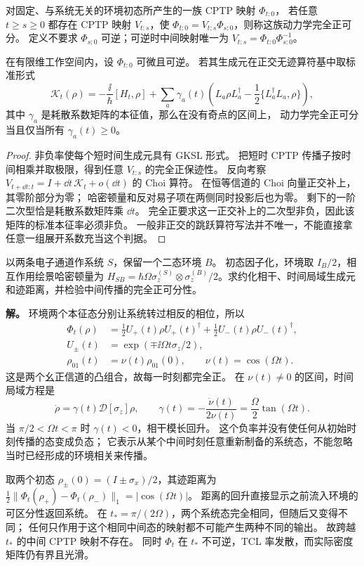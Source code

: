 \begin{definition}[完全正可分动力学]
对固定、与系统无关的环境初态所产生的一族 CPTP 映射 $\Phi_{t:0}$，
若任意 $t\ge s\ge0$ 都存在 CPTP 映射 $V_{t:s}$，使
$\Phi_{t:0}=V_{t:s}\Phi_{s:0}$，则称这族动力学完全正可分。
定义不要求 $\Phi_{s:0}$ 可逆；可逆时中间映射唯一为
$V_{t:s}=\Phi_{t:0}\Phi_{s:0}^{-1}$。
\end{definition}

\begin{proposition}[可逆时间局域方程的瞬时率判据]
在有限维工作空间内，设 $\Phi_{t:0}$ 可微且可逆。
若其生成元在正交无迹算符基中取标准形式
\[
\mathcal K_t(\rho)=-\frac{\ii}{\hbar}[H_t,\rho]
+\sum_a\gamma_a(t)
\left(L_a\rho L_a^\dagger-\frac12\{L_a^\dagger L_a,\rho\}\right),
\]
其中 $\gamma_a$ 是耗散系数矩阵的本征值，那么在没有奇点的区间上，
动力学完全正可分当且仅当所有 $\gamma_a(t)\ge0$。
\end{proposition}
\begin{proof}
非负率使每个短时间生成元具有 GKSL 形式。
把短时 CPTP 传播子按时间相乘并取极限，得到任意 $V_{t:s}$ 的完全正保迹性。
反向考察 $V_{t+\dd t:t}=I+\dd t\,\mathcal K_t+o(\dd t)$ 的 Choi 算符。
在恒等信道的 Choi 向量正交补上，其零阶部分为零；
哈密顿量和反对易子项在两侧同时投影后也为零。
剩下的一阶二次型恰是耗散系数矩阵乘 $\dd t$。
完全正要求这一正交补上的二次型非负，因此该矩阵的标准本征率必须非负。
一般非正交的跳跃算符写法并不唯一，不能直接拿任意一组展开系数充当这个判据。
\end{proof}

\begin{exbox}
以两条电子通道作系统 $S$，保留一个二态环境 $B$。
初态因子化，环境取 $I_B/2$，相互作用绘景哈密顿量为
$H_{SB}=\hbar\Omega\sigma_z^{(S)}\otimes\sigma_z^{(B)}/2$。求约化相干、时间局域生成元和迹距离，并检验中间传播的完全正可分性。

\textbf{解。}
环境两个本征态分别让系统转过相反的相位，所以
\begin{align*}
\Phi_t(\rho)&=\frac12U_+(t)\rho U_+(t)^\dagger
+\frac12U_-(t)\rho U_-(t)^\dagger,\\
U_\pm(t)&=\exp(\mp\ii\Omega t\sigma_z/2),\\
\rho_{01}(t)&=\nu(t)\rho_{01}(0),\qquad\nu(t)=\cos(\Omega t).
\end{align*}
这是两个幺正信道的凸组合，故每一时刻都完全正。
在 $\nu(t)\ne0$ 的区间，时间局域方程是
\begin{equation}
\dot\rho=\gamma(t)\mathcal D[\sigma_z]\rho,
\qquad\gamma(t)=-\frac{\dot\nu(t)}{2\nu(t)}
=\frac{\Omega}{2}\tan(\Omega t).
\label{eq:feqo-exact-finite-memory-dephasing-revival}
\end{equation}
当 $\pi/2<\Omega t<\pi$ 时 $\gamma(t)<0$，相干模长回升。
这个负率并没有使任何从初始时刻传播的态变成负态；
它表示从某个中间时刻任意重新制备的系统态，不能忽略当时已经形成的环境相关来传播。

取两个初态 $\rho_\pm(0)=(I\pm\sigma_x)/2$，其迹距离为
$\tfrac12\|\Phi_t(\rho_+)-\Phi_t(\rho_-)\|_1=|\cos(\Omega t)|$。
距离的回升直接显示之前流入环境的可区分性返回系统。
在 $t_*=\pi/(2\Omega)$，两个系统态完全相同，但随后又变得不同；
任何只作用于这个相同中间态的映射都不可能产生两种不同的输出。
故跨越 $t_*$ 的中间 CPTP 映射不存在。
同时 $\Phi_t$ 在 $t_*$ 不可逆，TCL 率发散，而实际密度矩阵仍有界且光滑。
\end{exbox}

